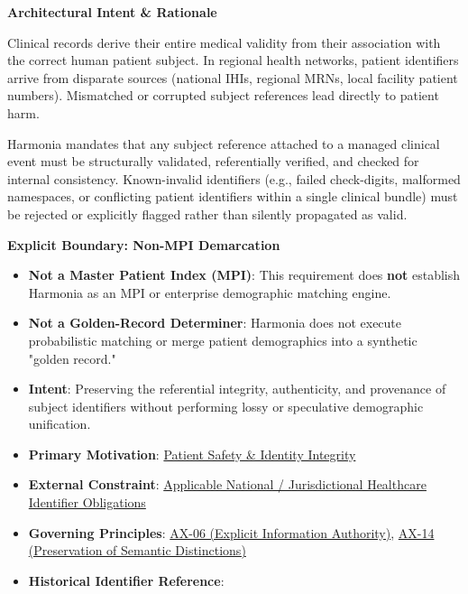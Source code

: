 \par\medskip\textbf{Architectural Intent \& Rationale}\par


Clinical records derive their entire medical validity from their association with the correct human patient subject. In regional health networks, patient identifiers arrive from disparate sources (national IHIs, regional MRNs, local facility patient numbers). Mismatched or corrupted subject references lead directly to patient harm.



Harmonia mandates that any subject reference attached to a managed clinical event must be structurally validated, referentially verified, and checked for internal consistency. Known-invalid identifiers (e.g., failed check-digits, malformed namespaces, or conflicting patient identifiers within a single clinical bundle) must be rejected or explicitly flagged rather than silently propagated as valid.



\par\medskip\textbf{Explicit Boundary: Non-MPI Demarcation}\par


\begin{itemize}


\item \textbf{Not a Master Patient Index (MPI)}: This requirement does \textbf{not} establish Harmonia as an MPI or enterprise demographic matching engine.

\item \textbf{Not a Golden-Record Determiner}: Harmonia does not execute probabilistic matching or merge patient demographics into a synthetic "golden record."

\item 

\textbf{Intent}: Preserving the referential integrity, authenticity, and provenance of subject identifiers without performing lossy or speculative demographic unification.




\item 

\textbf{Primary Motivation}: \href{\detokenize{../../../../../docs/markdown/01-motivation/drivers-assessments/drivers.md}}{Patient Safety \& Identity Integrity}




\item \textbf{External Constraint}: \href{\detokenize{../../../../../docs/markdown/01-motivation/requirements-constraints/external-constraints.md}}{Applicable National / Jurisdictional Healthcare Identifier Obligations}

\item \textbf{Governing Principles}: \hyperref[element:952c3b6148ce4fce94b69f99a0c2fec7]{AX-06 (Explicit Information Authority)}, \hyperref[element:d3fc6025dc7646d1b2020b51f7a44bfa]{AX-14 (Preservation of Semantic Distinctions)}

\item \textbf{Historical Identifier Reference}: \texttt{}

\end{itemize}

